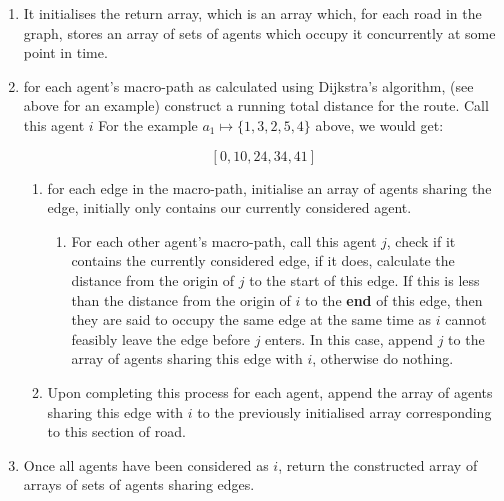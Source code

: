 \begin{enumerate}
  \item It initialises the return array, which is an array which, for each road in the graph, stores an array of sets of agents which occupy it concurrently at some point in time.
  \item for each agent's macro-path as calculated using Dijkstra's algorithm, (see above for an example) construct a running total distance for the route. Call this agent $i$
        For the example $a_{1} \mapsto \{ 1,3,2,5,4 \} $ above, we would get:

        \[
        [0,10,24,34,41]
        \]
\begin{enumerate}
  \item  for each edge in the macro-path, initialise an array of agents sharing the edge, initially only contains our currently considered agent.
        \begin{enumerate}
  \item For each other agent's macro-path, call this agent $j$, check if it contains the currently considered edge, if it does, calculate the distance from the origin of $j$ to the start of this edge. If this is less than the distance from the origin of $i$ to the \textbf{end} of this edge, then they are said to occupy the same edge at the same time as $i$ cannot feasibly leave the edge before $j$ enters. In this case, append $j$ to the array of agents sharing this edge with $i$, otherwise do nothing.

        \end{enumerate}

  \item Upon completing this process for each agent, append the array of agents sharing this edge with $i$ to the previously initialised array corresponding to this section of road.
\end{enumerate}


  \item Once all agents have been considered as $i$, return the constructed array of arrays of sets of agents sharing edges.
\end{enumerate}


